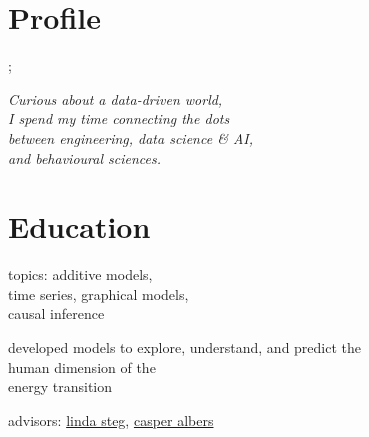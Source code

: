 
\begin{minipage}[t]{0.33\textwidth} %

\section{Profile}
;

\emph{Curious about a data-driven world,\\ I spend my time connecting the dots\\ between engineering, data science \& AI,\\ and behavioural sciences.}

\vspace{8pt}

\section{Education} 
\vspace{\topsep} %
\vspace{1pt}
\begin{tightitemize}
\item topics: additive models, \\time series, graphical models,\\ causal inference
\item developed models to explore, understand, and predict the\\ human dimension of the\\ energy transition
\item advisors: \href{https://www.rug.nl/staff/e.m.steg/}{linda steg}, \href{https://www.rug.nl/staff/c.j.albers//}{casper albers} 
\end{tightitemize}
\vspace{7pt}


\end{minipage}
